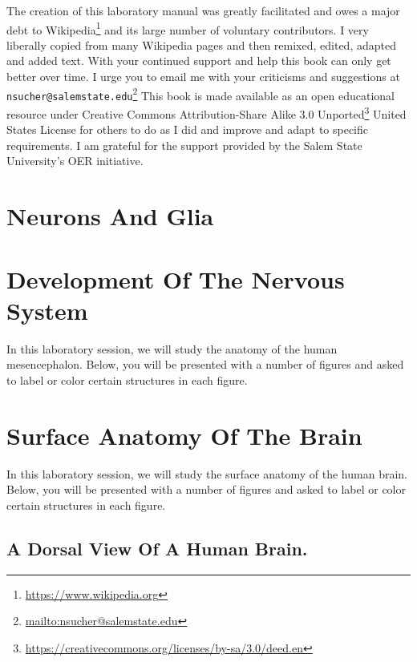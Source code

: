 \documentclass[]{book}
\let\rmarkdownfootnote\footnote%
\def\footnote{\protect\rmarkdownfootnote}
\renewcommand{\href}[2]{#2\footnote{\url{#1}}}
\begin{document}
The creation of this laboratory manual was greatly facilitated and owes a major debt to \href{https://www.wikipedia.org}{Wikipedia} and its large number of voluntary contributors. I very liberally copied from many Wikipedia pages and then remixed, edited, adapted and added text. With your continued support and help this book can only get better over time. I urge you to email me with your criticisms and suggestions at \href{mailto:nsucher@salemstate.edu}{\nolinkurl{nsucher@salemstate.edu}} This book is made available as an open educational resource under \href{https://creativecommons.org/licenses/by-sa/3.0/deed.en}{Creative Commons Attribution-Share Alike 3.0 Unported} United States License for others to do as I did and improve and adapt to specific requirements. I am grateful for the support provided by the Salem State University's OER initiative.

\hypertarget{neurons-and-glia}{%
\chapter{Neurons And Glia}\label{neurons-and-glia}}

\hypertarget{development-of-the-nervous-system}{%
\chapter{Development Of The Nervous System}\label{development-of-the-nervous-system}}

In this laboratory session, we will study the anatomy of the human mesencephalon. Below, you will be presented with a number of figures and asked to label or color certain structures in each figure.

\hypertarget{surface-anatomy-of-the-brain}{%
\chapter{Surface Anatomy Of The Brain}\label{surface-anatomy-of-the-brain}}

In this laboratory session, we will study the surface anatomy of the human brain. Below, you will be presented with a number of figures and asked to label or color certain structures in each figure.

\hypertarget{a-dorsal-view-of-a-human-brain.}{%
\section{A Dorsal View Of A Human Brain.}\label{a-dorsal-view-of-a-human-brain.}}
\end{document}
